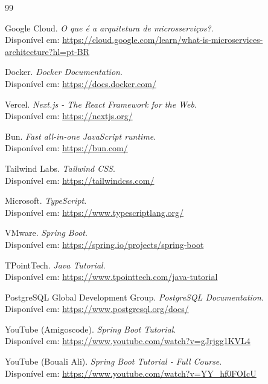 \begin{thebibliography}{99}

Google Cloud. \textit{O que é a arquitetura de microsserviços?}. \\
Disponível em: \url{https://cloud.google.com/learn/what-is-microservices-architecture?hl=pt-BR}

Docker. \textit{Docker Documentation}. \\
Disponível em: \url{https://docs.docker.com/}

Vercel. \textit{Next.js - The React Framework for the Web}. \\
Disponível em: \url{https://nextjs.org/}

Bun. \textit{Fast all-in-one JavaScript runtime}. \\
Disponível em: \url{https://bun.com/}

Tailwind Labs. \textit{Tailwind CSS}. \\
Disponível em: \url{https://tailwindcss.com/}

Microsoft. \textit{TypeScript}. \\
Disponível em: \url{https://www.typescriptlang.org/}

VMware. \textit{Spring Boot}. \\
Disponível em: \url{https://spring.io/projects/spring-boot}

TPointTech. \textit{Java Tutorial}. \\
Disponível em: \url{https://www.tpointtech.com/java-tutorial}

PostgreSQL Global Development Group. \textit{PostgreSQL Documentation}. \\
Disponível em: \url{https://www.postgresql.org/docs/}

YouTube (Amigoscode). \textit{Spring Boot Tutorial}. \\
Disponível em: \url{https://www.youtube.com/watch?v=gJrjgg1KVL4}

YouTube (Bouali Ali). \textit{Spring Boot Tutorial - Full Course}. \\
Disponível em: \url{https://www.youtube.com/watch?v=YY_hf0FOIcU}

\end{thebibliography}